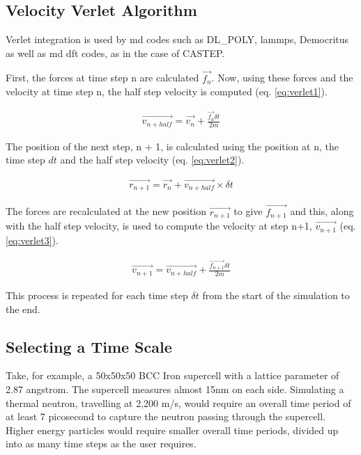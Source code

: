 \subsection{Velocity Verlet Algorithm}

Verlet integration is used by \acrshort{md} codes such as DL\_POLY, \acrshort{lammps}, Democritus as well as \acrshort{md} \acrshort{dft} codes, as in the case of CASTEP.  

First, the forces at time step n are calculated $\vec{f_{n}}$.  Now, using these forces and the velocity at time step n, the half step velocity is computed (eq. \ref{eq:verlet1}).

\begin{equation}
\begin{split}
\vec{v_{n+half}} = \vec{v_{n}} + \frac{\vec{f_{n}} \delta t}{2 m}
\end{split}
\label{eq:verlet1}
\end{equation}

The position of the next step, n + 1, is calculated using the position at n, the time step $dt$ and the half step velocity (eq. \ref{eq:verlet2}).

\begin{equation}
\begin{split}
\vec{r_{n+1}} = \vec{r_{n}} + \vec{v_{n+half}} \times \delta t
\end{split}
\label{eq:verlet2}
\end{equation}

The forces are recalculated at the new position $\vec{r_{n+1}}$ to give $\vec{f_{n+1}}$ and this, along with the half step velocity, is used to compute the velocity at step n+1, $\vec{v_{n+1}}$ (eq. \ref{eq:verlet3}). 

\begin{equation}
\begin{split}
\vec{v_{n+1}} = \vec{v_{n+half}} + \frac{\vec{f_{n+1}} \delta t}{2 m}
\end{split}
\label{eq:verlet3}
\end{equation}

This process is repeated for each time step $\delta t$ from the start of the simulation to the end.  




\subsection{Selecting a Time Scale}

Take, for example, a 50x50x50 BCC Iron supercell with a lattice parameter of 2.87 angstrom.  The supercell measures almost 15nm on each side.  Simulating a thermal neutron, travelling at 2,200 m/s, would require an overall time period of at least 7 picosecond to capture the neutron passing through the supercell.  Higher energy particles would require smaller overall time periods, divided up into as many time steps as the user requires.  


